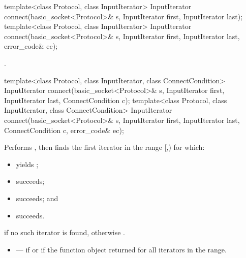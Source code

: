 \begin{itemdecl}
template<class Protocol, class InputIterator>
  InputIterator connect(basic_socket<Protocol>& s,
                        InputIterator first, InputIterator last);
template<class Protocol, class InputIterator>
  InputIterator connect(basic_socket<Protocol>& s,
                        InputIterator first, InputIterator last,
                        error_code& ec);
\end{itemdecl}

\begin{itemdescr}
\pnum
\returns {}.
\end{itemdescr}

\begin{itemdecl}
template<class Protocol, class InputIterator, class ConnectCondition>
  InputIterator connect(basic_socket<Protocol>& s,
                        InputIterator first, InputIterator last,
                        ConnectCondition c);
template<class Protocol, class InputIterator, class ConnectCondition>
  InputIterator connect(basic_socket<Protocol>& s,
                        InputIterator first, InputIterator last,
                        ConnectCondition c, error_code& ec);
\end{itemdecl}

\begin{itemdescr}
\pnum
\effects Performs , then finds the first iterator  in the range [,) for which:
\begin{itemize}
\item
{} yields ;
\item
{} succeeds;
\item
{} succeeds; and
\item
{} succeeds.
\end{itemize}

\pnum
\returns {} if no such iterator is found, otherwise .

\pnum
\errors
\begin{itemize}
\item
{} --- if  or if the function object  returned  for all iterators in the range.
\end{itemize}
\end{itemdescr}



